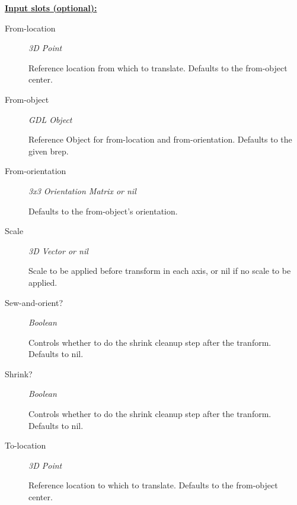 \documentclass [11pt]{book}
\begin{document}
\begin{itemize}
\begin{description}
\end{description}






\textbf{
\underline{Input slots (optional):}}

\begin{description}

\item [From-location]
\emph{3D Point}

 Reference location from which to translate. Defaults to the from-object center.




\item [From-object]
\emph{GDL Object}

 Reference Object for from-location and from-orientation. Defaults to the given brep.




\item [From-orientation]
\emph{3x3 Orientation Matrix or nil}

 Defaults to the from-object's orientation.




\item [Scale]
\emph{3D Vector or nil}

 Scale to be applied before transform in each axis, or nil if no scale to be applied.




\item [Sew-and-orient?]
\emph{Boolean}

 Controls whether to do the shrink cleanup step after the tranform. Defaults to nil.




\item [Shrink?]
\emph{Boolean}

 Controls whether to do the shrink cleanup step after the tranform. Defaults to nil.




\item [To-location]
\emph{3D Point}

 Reference location to which to translate. Defaults to the from-object center.





\end{description}
\end{itemize}
\end{document}
